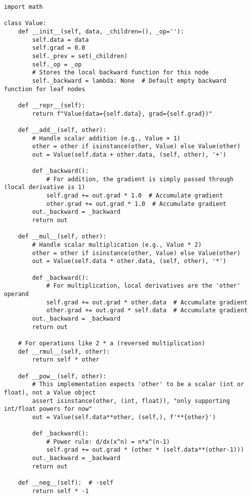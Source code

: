 \begin{lstlisting}[caption={Adding Arithmetic Operations to Value}] 
import math

class Value: 
    def __init__(self, data, _children=(), _op=''): 
        self.data = data 
        self.grad = 0.0 
        self._prev = set(_children) 
        self._op = _op 
        # Stores the local backward function for this node 
        self._backward = lambda: None  # Default empty backward function for leaf nodes

    def __repr__(self):
        return f"Value(data={self.data}, grad={self.grad})"

    def __add__(self, other):
        # Handle scalar addition (e.g., Value + 1)
        other = other if isinstance(other, Value) else Value(other)
        out = Value(self.data + other.data, (self, other), '+')

        def _backward():
            # For addition, the gradient is simply passed through (local derivative is 1)
            self.grad += out.grad * 1.0  # Accumulate gradient
            other.grad += out.grad * 1.0  # Accumulate gradient
        out._backward = _backward
        return out

    def __mul__(self, other):
        # Handle scalar multiplication (e.g., Value * 2)
        other = other if isinstance(other, Value) else Value(other)
        out = Value(self.data * other.data, (self, other), '*')

        def _backward():
            # For multiplication, local derivatives are the 'other' operand
            self.grad += out.grad * other.data  # Accumulate gradient
            other.grad += out.grad * self.data  # Accumulate gradient
        out._backward = _backward
        return out

    # For operations like 2 * a (reversed multiplication)
    def __rmul__(self, other):
        return self * other

    def __pow__(self, other):
        # This implementation expects 'other' to be a scalar (int or float), not a Value object
        assert isinstance(other, (int, float)), "only supporting int/float powers for now"
        out = Value(self.data**other, (self,), f'**{other}')

        def _backward():
            # Power rule: d/dx(x^n) = n*x^(n-1)
            self.grad += out.grad * (other * (self.data**(other-1)))
        out._backward = _backward
        return out

    def __neg__(self):  # -self
        return self * -1


\end{lstlisting}

